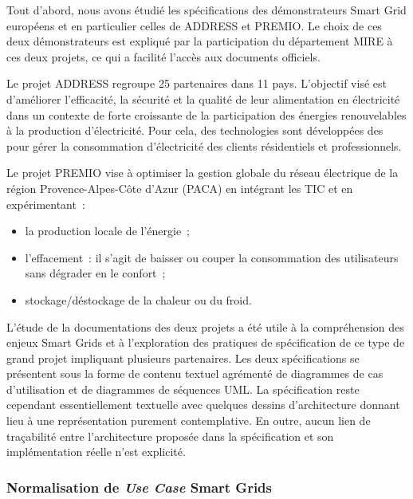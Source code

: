 Tout d'abord, nous avons étudié les spécifications des démonstrateurs Smart Grid
européens et en particulier celles de ADDRESS et PREMIO. Le choix de ces deux
démonstrateurs est expliqué par la participation du département MIRE à ces deux
projets, ce qui a facilité l'accès aux documents officiels.



Le projet ADDRESS regroupe 25 partenaires dans 11 pays. L'objectif visé est
d'améliorer l'efficacité, la sécurité et la qualité de leur alimentation en
électricité dans un contexte de forte croissante de la participation des
énergies renouvelables à la production d'électricité. Pour cela, des
technologies sont développées des pour gérer la consommation d'électricité des
clients résidentiels et professionnels.

Le projet PREMIO vise à optimiser la gestion globale du réseau électrique de la
région Provence-Alpes-Côte d'Azur (PACA) en intégrant les TIC et en
expérimentant~:
\begin{itemize}
    \item la production locale de l'énergie~;
    \item l'effacement~: il s'agit de baisser ou couper la consommation des utilisateurs
sans dégrader en le confort~;
    \item stockage/déstockage de la chaleur ou du froid.
\end{itemize}

L'étude de la documentations des deux projets a été utile à la compréhension des
enjeux Smart Grids et à l'exploration des pratiques de spécification de ce type
de grand projet impliquant plusieurs partenaires. Les deux spécifications se
présentent sous la forme de contenu textuel agrémenté de diagrammes de cas
d'utilisation et de diagrammes de séquences UML. La spécification reste
cependant essentiellement textuelle avec quelques dessins d'architecture donnant
lieu à une représentation purement contemplative. En outre, aucun lien de
traçabilité entre l'architecture proposée dans la spécification et son
implémentation réelle n'est explicité.

\subsubsection{Normalisation de \textit{Use Case} Smart Grids}
\label{sec:ENEL}

